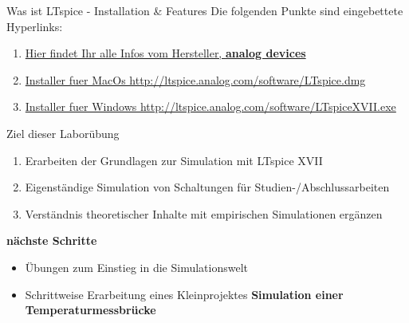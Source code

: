\documentclass{beamer}
\begin{document}
   \begin{frame}[fragile]{Was ist LTspice - Installation \& Features}
	Die folgenden Punkte sind eingebettete Hyperlinks:
	\begin{enumerate}
\item \href{https://www.analog.com/en/design-center/design-tools-and-calculators/ltspice-simulator.html}{Hier findet Ihr alle Infos vom Hersteller, \textbf{analog devices}}
\item \href{http://ltspice.analog.com/software/LTspice.dmg}{Installer fuer MacOs http://ltspice.analog.com/software/LTspice.dmg}
\item \href{http://ltspice.analog.com/software/LTspiceXVII.exe}{Installer fuer Windows http://ltspice.analog.com/software/LTspiceXVII.exe}
	\end{enumerate}
	
\begin{center}


\end{center} 
\end{frame}

 \begin{frame}[fragile]{Ziel dieser Laborübung}

\begin{enumerate}
\item Erarbeiten der Grundlagen zur Simulation mit LTspice XVII
\item Eigenständige Simulation von Schaltungen für Studien-/Abschlussarbeiten
\item Verständnis theoretischer Inhalte mit empirischen Simulationen ergänzen
\end{enumerate}

\textbf{nächste Schritte}

\begin{itemize}
\item Übungen zum Einstieg in die Simulationswelt
\item Schrittweise Erarbeitung eines Kleinprojektes \newline \textbf{Simulation einer Temperaturmessbrücke}
\end{itemize}

  \end{frame}
  
\end{document}
